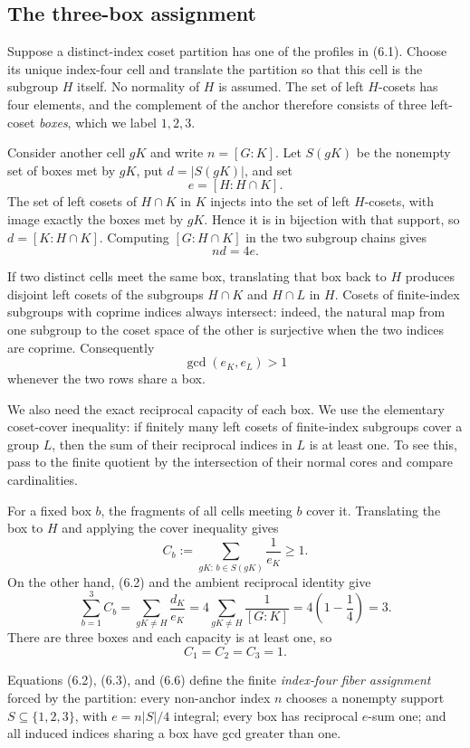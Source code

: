 \documentclass[11pt]{article}
\theoremstyle{definition}
\begin{document}
\subsection{The three-box assignment}

Suppose a distinct-index coset partition has one of the profiles in (6.1).
Choose its unique index-four cell and translate the partition so that this
cell is the subgroup $H$ itself. No normality of $H$ is assumed. The set of
left $H$-cosets has four elements, and the complement of the anchor therefore
consists of three left-coset \emph{boxes}, which we label $1,2,3$.

Consider another cell $gK$ and write $n=[G:K]$. Let $S(gK)$ be the nonempty
set of boxes met by $gK$, put $d=|S(gK)|$, and set
\[
  e=[H:H\cap K].
\]
The set of left cosets of $H\cap K$ in $K$ injects into the set of left
$H$-cosets, with image exactly the boxes met by $gK$. Hence it is in
bijection with that support, so $d=[K:H\cap K]$. Computing
$[G:H\cap K]$ in the two subgroup chains gives
\[
  n d = 4e. \tag{6.2}
\]

If two distinct cells meet the same box, translating that box back to $H$
produces disjoint left cosets of the subgroups $H\cap K$ and $H\cap L$ in
$H$. Cosets of finite-index subgroups with coprime indices always intersect:
indeed, the natural map from one subgroup to the coset space of the other is
surjective when the two indices are coprime. Consequently
\[
  \gcd(e_K,e_L)>1 \tag{6.3}
\]
whenever the two rows share a box.

We also need the exact reciprocal capacity of each box. We use the elementary
coset-cover inequality: if finitely many left cosets of finite-index
subgroups cover a group $L$, then the sum of their reciprocal indices in $L$
is at least one. To see this, pass to the finite quotient by the intersection
of their normal cores and compare cardinalities.

For a fixed box $b$, the fragments of all cells meeting $b$ cover it.
Translating the box to $H$ and applying the cover inequality gives
\[
  C_b:=\sum_{gK:\,b\in S(gK)}\frac1{e_K}\geq1. \tag{6.4}
\]
On the other hand, (6.2) and the ambient reciprocal identity give
\[
  \sum_{b=1}^3 C_b
   =\sum_{gK\ne H}\frac{d_K}{e_K}
   =4\sum_{gK\ne H}\frac1{[G:K]}
   =4\left(1-\frac14\right)=3. \tag{6.5}
\]
There are three boxes and each capacity is at least one, so
\[
  C_1=C_2=C_3=1. \tag{6.6}
\]

Equations (6.2), (6.3), and (6.6) define the finite
\emph{index-four fiber assignment} forced by the partition: every non-anchor
index $n$ chooses a nonempty support $S\subseteq\{1,2,3\}$, with
$e=n|S|/4$ integral; every box has reciprocal $e$-sum one; and all induced
indices sharing a box have gcd greater than one.
\end{document}
